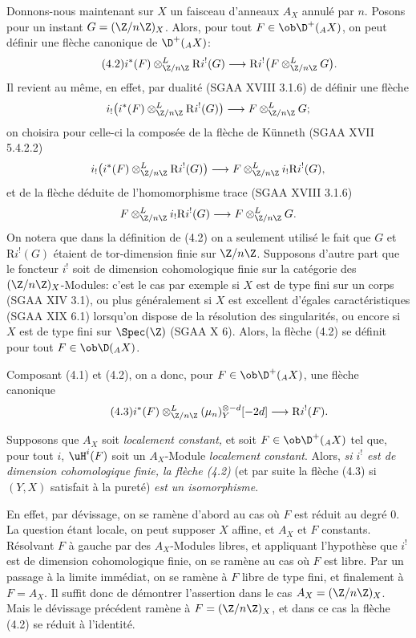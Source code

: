 Donnons-nous maintenant sur $X$ un faisceau d'anneaux $A_X$ annulé par $n$. Posons pour un instant $G=(\Z/n\Z)_X$. Alors, pour tout $F\in\ob\D^+({}_A X)$, on peut définir une flèche canonique de $\D^+({}_A X)$:
\begin{equation}\tag{4.2}
        i^*(F)\otimes^L_{\Z/n\Z} \mathrm{R} i^!(G)\longrightarrow \mathrm{R} i^!\bigl(F\otimes^L_{\Z/n\Z}G\bigr).
\end{equation}
Il revient au même, en effet, par dualité (SGAA XVIII 3.1.6) de définir une flèche
\[
        i_!\bigl(i^*(F)\otimes^L_{\Z/n\Z}\mathrm{R} i^!(G)\bigr)\longrightarrow F\otimes^L_{\Z/n\Z}G;
\]
on choisira pour celle-ci la composée de la flèche de Künneth (SGAA XVII 5.4.2.2)
\[
        i_!\bigl(i^*(F)\otimes^L_{\Z/n\Z}\mathrm{R} i^!(G)\bigr)\longrightarrow F\otimes^L_{\Z/n\Z}i_!\mathrm{R} i^!(G),
\]
et de la flèche déduite de l'homomorphisme trace (SGAA XVIII 3.1.6)
\[
        F\otimes^L_{\Z/n\Z}i_!\mathrm{R} i^!(G)\longrightarrow F\otimes^L_{\Z/n\Z}G.
\]
On notera que dans la définition de (4.2) on a seulement utilisé le fait que $G$ et $\mathrm{R} i^!(G)$ étaient de tor-dimension finie sur $\Z/n\Z$. Supposons d'autre part que le foncteur $i^!$ soit de dimension cohomologique finie sur la catégorie des $(\Z/n\Z)_X$-Modules: c'est le cas par exemple si $X$ est de type fini sur un corps (SGAA XIV 3.1), ou plus généralement si $X$ est excellent d'égales caractéristiques (SGAA XIX 6.1) lorsqu'on dispose de la résolution des singularités, ou encore si $X$ est de type fini sur $\Spec(\Z)$ (SGAA X 6). Alors, la flèche (4.2) se définit pour tout $F\in\ob\D({}_A X)$.

Composant (4.1) et (4.2), on a donc, pour $F\in\ob\D^+({}_A X)$, une flèche canonique
\begin{equation}\tag{4.3}
        i^*(F)\otimes^L_{\Z/n\Z}(\mu_n)_Y^{\otimes -d}[-2d]\longrightarrow \mathrm{R} i^!(F).
\end{equation}

Supposons que $A_X$ soit \emph{localement constant,} et soit $F\in\ob\D^+({}_A X)$ tel que, pour tout $i$, $\uH^i(F)$ soit un $A_X$-Module \emph{localement constant}. Alors, \emph{si $i^!$ est de dimension cohomologique finie, la flèche (4.2)} (et par suite la flèche (4.3) si $(Y,X)$ satisfait à la pureté) \emph{est un isomorphisme}.

En effet, par dévissage, on se ramène d'abord au cas où $F$ est réduit au degré $0$. La question étant locale, on peut supposer $X$ affine, et $A_X$ et $F$ constants. Résolvant $F$ à gauche par des $A_X$-Modules libres, et appliquant l'hypothèse que $i^!$ est de dimension cohomologique finie, on se ramène au cas où $F$ est libre. Par un passage à la limite immédiat, on se ramène à $F$ libre de type fini, et finalement à $F=A_X$. Il suffit donc de démontrer l'assertion dans le cas $A_X=(\Z/n\Z)_X$. Mais le dévissage précédent ramène à $F=(\Z/n\Z)_X$, et dans ce cas la flèche (4.2) se réduit à l'identité.

